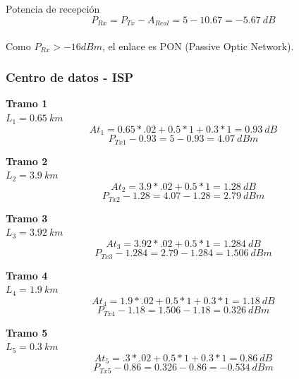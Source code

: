 \documentclass[12pt,letterpaper]{article}
\begin{document}
Potencia de recepción
\begin{equation}
    P_{Rx}=P_{Tx}-A_{Real}=5-10.67=-5.67 \ dB
\end{equation}
\\
Como $P_{Rx}>-16dBm$, el enlace es PON (Passive Optic Network).

\newpage
\subsubsection{Centro de datos - ISP}
\textbf{Tramo 1} \\
$L_1=0.65 \ km$
\\
\begin{equation}
    At_1=0.65*.02+0.5*1+0.3*1=0.93 \ dB
\end{equation}
\begin{equation}
    P_{Tx1}-0.93=5-0.93=4.07 \ dBm
\end{equation}

\textbf{Tramo 2} \\
$L_2=3.9 \ km$
\\
\begin{equation}
    At_2=3.9*.02+0.5*1=1.28 \ dB
\end{equation}
\begin{equation}
    P_{Tx2}-1.28=4.07-1.28=2.79 \ dBm
\end{equation}

\textbf{Tramo 3} \\
$L_3=3.92 \ km$
\\ 
\begin{equation}
    At_3=3.92*.02+0.5*1=1.284 \ dB
\end{equation}
\begin{equation}
    P_{Tx3}-1.284=2.79-1.284=1.506 \ dBm
\end{equation}

\textbf{Tramo 4} \\
$L_4=1.9 \ km$
\\ 
\begin{equation}
    At_4=1.9*.02+0.5*1+0.3*1=1.18 \ dB
\end{equation}
\begin{equation}
    P_{Tx4}-1.18=1.506-1.18=0.326 \ dBm
\end{equation}

\textbf{Tramo 5} \\
$L_5=0.3 \ km$
\\
\begin{equation}
    At_5=.3*.02+0.5*1+0.3*1=0.86 \ dB
\end{equation}
\begin{equation}
    P_{Tx5}-0.86=0.326-0.86=-0.534 \ dBm
\end{equation}
\end{document}
